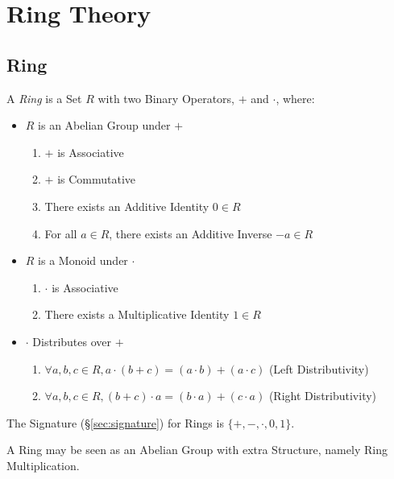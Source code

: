 \section{Ring Theory}\label{sec:ring_theory}

\subsection{Ring}\label{sec:ring}

A \emph{Ring} is a Set $R$ with two Binary Operators, $+$ and $\cdot$, where:
\begin{itemize}
\item $R$ is an Abelian Group under $+$
    \begin{enumerate}
        \item $+$ is Associative
        \item $+$ is Commutative
        \item There exists an Additive Identity $0 \in R$
        \item For all $a \in R$, there exists an Additive Inverse $-a
          \in R$
    \end{enumerate}
\item $R$ is a Monoid under $\cdot$
    \begin{enumerate}
        \item $\cdot$ is Associative
        \item There exists a Multiplicative Identity $1 \in R$
    \end{enumerate}
\item $\cdot$ Distributes over $+$
    \begin{enumerate}
        \item $\forall a,b,c \in R,
            a \cdot (b + c) = (a \cdot b) + (a \cdot c)$
            (Left Distributivity)
        \item $\forall a,b,c \in R,
            (b + c) \cdot a = (b \cdot a) + (c \cdot a)$
            (Right Distributivity)
    \end{enumerate}
\end{itemize}
The Signature (\S\ref{sec:signature}) for Rings is $\{+, -, \cdot, 0, 1\}$.

A Ring may be seen as an Abelian Group with extra Structure, namely Ring
Multiplication.

